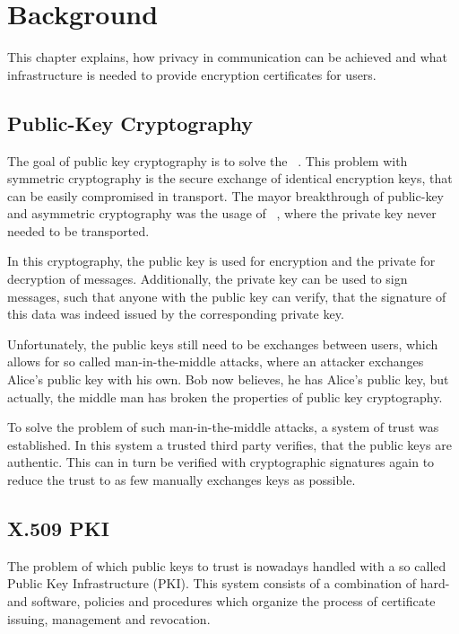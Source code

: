 \chapter{Background}\label{ch:publicKeyInfrastructure}
This chapter explains, how privacy in communication can be achieved and what infrastructure is needed to provide
encryption certificates for users.

\section{Public-Key Cryptography}\label{sec:publicKeyCryptography}
The goal of public key cryptography is to solve the ~\cite{diffie1976new}.
This problem with symmetric cryptography is the secure exchange of identical encryption keys, that can be easily
compromised in transport.
The mayor breakthrough of public-key and asymmetric cryptography was the usage of ~\cite{schneier2007applied}, where the private key never needed to be transported.

In this cryptography, the public key is used for encryption and the private for decryption of messages.
Additionally, the private key can be used to sign messages, such that anyone with the public key can verify, that the
signature of this data was indeed issued by the corresponding private key.

Unfortunately, the public keys still need to be exchanges between users, which allows for so called man-in-the-middle
attacks, where an attacker exchanges Alice's public key with his own.
Bob now believes, he has Alice's public key, but actually, the middle man has broken the properties of public key
cryptography.

To solve the problem of such man-in-the-middle attacks, a system of trust was established.
In this system a trusted third party verifies, that the public keys are authentic.
This can in turn be verified with cryptographic signatures again to reduce the trust to as few manually exchanges keys
as possible.

\section{X.509 PKI}\label{sec:publicKeyInfrastructure}
The problem of which public keys to trust is nowadays handled with a so called Public Key Infrastructure (PKI).
This system consists of a combination of hard- and software, policies and procedures which organize the process of
certificate issuing, management and revocation.

